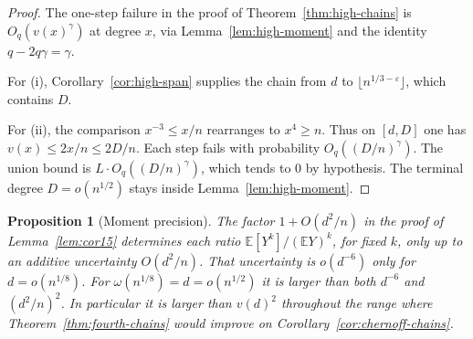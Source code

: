 \documentclass[11pt]{article}
\newtheorem{proposition}[theorem]{Proposition}
\newcommand{\EE}{\mathbb{E}}
\begin{document}
\begin{proof}
The one-step failure in the proof of Theorem~\ref{thm:high-chains} is \(O_q(v(x)^\gamma)\) at degree \(x\), via Lemma~\ref{lem:high-moment} and the identity \(q-2q\gamma=\gamma\).

For (i), Corollary~\ref{cor:high-span} supplies the chain from \(d\) to \(\lfloor n^{1/3-\varepsilon}\rfloor\), which contains \(D\).

For (ii), the comparison \(x^{-3}\le x/n\) rearranges to \(x^4\ge n\). Thus on \([d,D]\) one has \(v(x)\le 2x/n\le 2D/n\).
Each step fails with probability \(O_q((D/n)^\gamma)\).
The union bound is \(L\cdot O_q((D/n)^\gamma)\), which tends to \(0\) by hypothesis.
The terminal degree \(D=o(n^{1/2})\) stays inside Lemma~\ref{lem:high-moment}.
\end{proof}

\begin{proposition}[Moment precision]
\label{prop:moment-precision}
The factor \(1+O(d^2/n)\) in the proof of Lemma~\ref{lem:cor15} determines each
ratio \(\EE[Y^k]/(\EE Y)^k\), for fixed \(k\), only up to an additive uncertainty
\(O(d^2/n)\).
That uncertainty is \(o(d^{-6})\) only for \(d=o(n^{1/8})\).
For \(\omega(n^{1/8})=d=o(n^{1/2})\) it is larger than both \(d^{-6}\) and
\((d^2/n)^2\).
In particular it is larger than \(v(d)^2\) throughout the range where
Theorem~\ref{thm:fourth-chains} would improve on Corollary~\ref{cor:chernoff-chains}.
\end{proposition}
\end{document}
